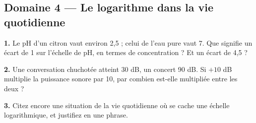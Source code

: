 \documentclass[11pt,a4paper]{article}
\begin{document}
\subsection*{Domaine 4 --- Le logarithme dans la vie quotidienne}
\textbf{1.} Le pH d'un citron vaut environ 2,5 ; celui de l'eau pure vaut 7. Que signifie un écart de 1 sur l'échelle de pH, en termes de concentration ? Et un écart de 4,5 ?
\par\smallskip
\noindent\makebox[\linewidth]{\dotfill}\par\vspace{1em}
\noindent\makebox[\linewidth]{\dotfill}\par\vspace{1em}
\noindent\makebox[\linewidth]{\dotfill}\par\vspace{1em}
\par\medskip
\textbf{2.} Une conversation chuchotée atteint 30 dB, un concert 90 dB. Si $+10$ dB multiplie la puissance sonore par 10, par combien est-elle multipliée entre les deux ?
\par\smallskip
\noindent\makebox[\linewidth]{\dotfill}\par\vspace{1em}
\noindent\makebox[\linewidth]{\dotfill}\par\vspace{1em}
\noindent\makebox[\linewidth]{\dotfill}\par\vspace{1em}
\par\medskip
\textbf{3.} Citez encore une situation de la vie quotidienne où se cache une échelle logarithmique, et justifiez en une phrase.
\par\smallskip
\noindent\makebox[\linewidth]{\dotfill}\par\vspace{1em}
\noindent\makebox[\linewidth]{\dotfill}\par\vspace{1em}
\noindent\makebox[\linewidth]{\dotfill}\par\vspace{1em}
\par\medskip
\end{document}
